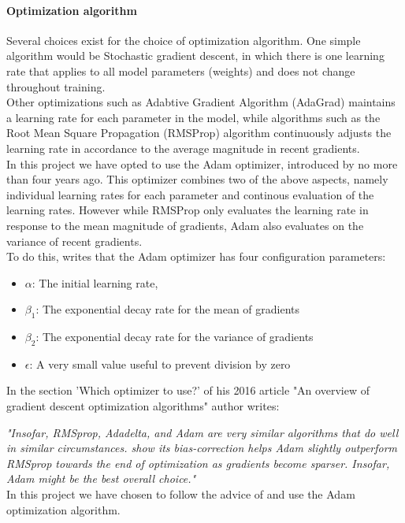 \begin{multicols}{2}
\paragraph{Optimization algorithm}
Several choices exist for the choice of optimization algorithm. One simple algorithm would be Stochastic gradient descent, in which there is one learning rate that applies to all model parameters (weights) and does not change throughout training.\\
Other optimizations such as Adabtive Gradient Algorithm (AdaGrad) maintains a learning rate for each parameter in the model, while algorithms such as the Root Mean Square Propagation (RMSProp) algorithm continuously adjusts the learning rate in accordance to the average magnitude in recent gradients.\\
In this project we have opted to use the Adam optimizer, introduced by \citeauthor{Adam} no more than four years ago. This optimizer combines two of the above aspects, namely individual learning rates for each parameter and continous evaluation of the learning rates. However while RMSProp only evaluates the learning rate in response to the mean magnitude of gradients, Adam also evaluates on the variance of recent gradients.\\
To do this, \citeauthor{Adam} writes that the Adam optimizer has four configuration parameters: 
\begin{itemize}
\item $\alpha$: The initial learning rate,
\item $\beta_1$: The exponential decay rate for the mean of gradients
\item $\beta_2$: The exponential decay rate for the variance of gradients
\item $\epsilon$: A very small value useful to prevent division by zero
\end{itemize}
In the section 'Which optimizer to use?' of his 2016 article "An overview of gradient descent optimization algorithms" author \citeauthor{Ruder16} writes:

\textit{"Insofar, RMSprop, Adadelta, and Adam are very similar algorithms that do well in similar circumstances. \citeauthor{Adam} show its bias-correction helps Adam slightly outperform RMSprop towards the end of optimization as gradients become sparser. Insofar, Adam might be the best overall choice."}\\
In this project we have chosen to follow the advice of \citeauthor{Ruder16} and use the Adam optimization algorithm.


\end{multicols}
